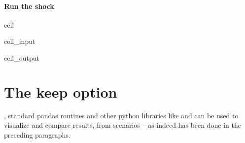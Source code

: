 \documentclass[letterpaper,10pt,english]{jupyterBook}
\begin{document}
\paragraph{Run the shock}
\label{\detokenize{content/06_WBModels/ScenarioAnalysis:run-the-shock}}
\begin{sphinxuseclass}{cell}\begin{sphinxVerbatimInput}

\begin{sphinxuseclass}{cell_input}
\begin{sphinxVerbatim}[commandchars=\\\{\}]
  
\PYG{p}{[}\PYG{p}{]}
\end{sphinxVerbatim}

\end{sphinxuseclass}\end{sphinxVerbatimInput}
\begin{sphinxVerbatimOutput}

\begin{sphinxuseclass}{cell_output}
\noindent{}

\end{sphinxuseclass}\end{sphinxVerbatimOutput}

\end{sphinxuseclass}

\section{The keep option}
\label{\detokenize{content/06_WBModels/ScenarioAnalysis:the-keep-option}}
\sphinxAtStartPar
{}, standard pandas routines and other python libraries like  and  can be used to visualize and compare results, from scenarios – as indeed has been done in the preceding paragraphs.
\end{document}
